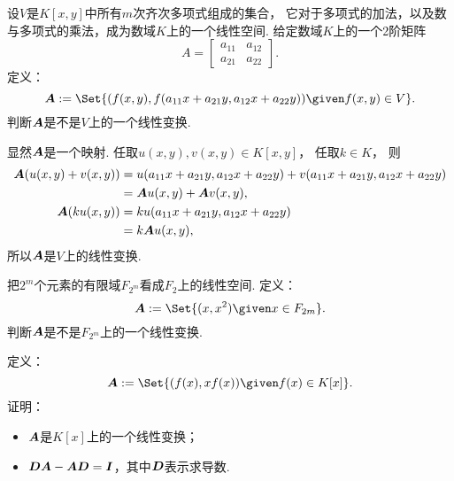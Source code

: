 \begin{example}
设\(V\)是\(K[x,y]\)中所有\(m\)次齐次多项式组成的集合，
它对于多项式的加法，以及数与多项式的乘法，成为数域\(K\)上的一个线性空间.
给定数域\(K\)上的一个2阶矩阵\begin{equation*}
	A = \begin{bmatrix}
		a_{11} & a_{12} \\
		a_{21} & a_{22}
	\end{bmatrix}.
\end{equation*}
定义：\begin{equation*}
	\vb{A} \defeq \Set{
		(f(x,y),f(a_{11}x+a_{21}y,a_{12}x+a_{22}y))
		\given
		f(x,y) \in V
	}.
\end{equation*}
判断\(\boldsymbol{A}\)是不是\(V\)上的一个线性变换.
\begin{solution}
显然\(\boldsymbol{A}\)是一个映射.
任取\(u(x,y),v(x,y) \in K[x,y]\)，
任取\(k \in K\)，
则\begin{align*}
	\boldsymbol{A}(u(x,y) + v(x,y))
	&= u(a_{11}x+a_{21}y,a_{12}x+a_{22}y) + v(a_{11}x+a_{21}y,a_{12}x+a_{22}y) \\
	&= \boldsymbol{A}u(x,y) + \boldsymbol{A}v(x,y), \\
	\boldsymbol{A}(k u(x,y))
	&= k u(a_{11}x+a_{21}y,a_{12}x+a_{22}y) \\
	&= k \boldsymbol{A}u(x,y),
\end{align*}
所以\(\boldsymbol{A}\)是\(V\)上的线性变换.
\end{solution}
\end{example}

\begin{example}
把\(2^m\)个元素的有限域\(F_{2^m}\)看成\(F_2\)上的线性空间.
定义：\begin{equation*}
	\vb{A} \defeq \Set{
		(x,x^2)
		\given
		x \in F_{2m}
	}.
\end{equation*}
判断\(\boldsymbol{A}\)是不是\(F_{2^m}\)上的一个线性变换.
\end{example}

\begin{example}
定义：\begin{equation*}
	\vb{A} \defeq \Set{
		(f(x),x f(x))
		\given
		f(x) \in K[x]
	}.
\end{equation*}
证明：\begin{itemize}
	\item \(\boldsymbol{A}\)是\(K[x]\)上的一个线性变换；
	\item \(\boldsymbol{D}\boldsymbol{A}-\boldsymbol{A}\boldsymbol{D}=\boldsymbol{I}\)，其中\(\boldsymbol{D}\)表示求导数.
\end{itemize}
\end{example}

